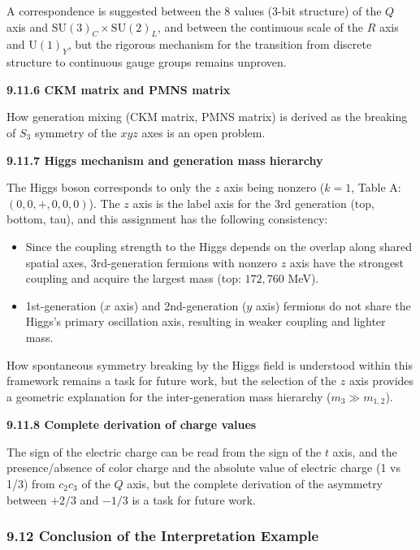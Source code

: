 \documentclass[
  a4paper,11pt]{article}
\providecommand{\tightlist}{%
  \setlength{\itemsep}{0pt}\setlength{\parskip}{0pt}}
\theoremstyle{definition}
\theoremstyle{remark}
\begin{document}
A correspondence is suggested between the 8 values (3-bit structure) of
the \(Q\) axis and \(\mathrm{SU}(3)_C \times \mathrm{SU}(2)_L\), and
between the continuous scale of the \(R\) axis and \(\mathrm{U}(1)_Y\),
but the rigorous mechanism for the transition from discrete structure to
continuous gauge groups remains unproven.

\textbf{9.11.6 CKM matrix and PMNS matrix}

How generation mixing (CKM matrix, PMNS matrix) is derived as the
breaking of \(S_3\) symmetry of the \(xyz\) axes is an open problem.

\textbf{9.11.7 Higgs mechanism and generation mass hierarchy}

The Higgs boson corresponds to only the \(z\) axis being nonzero
(\(k = 1\), Table A: \((0, 0, +, 0, 0, 0)\)). The \(z\) axis is the
label axis for the 3rd generation (top, bottom, tau), and this
assignment has the following consistency:

\begin{itemize}
\tightlist
\item
  Since the coupling strength to the Higgs depends on the overlap along
  shared spatial axes, 3rd-generation fermions with nonzero \(z\) axis
  have the strongest coupling and acquire the largest mass (top:
  \(172{,}760\) MeV).
\item
  1st-generation (\(x\) axis) and 2nd-generation (\(y\) axis) fermions
  do not share the Higgs's primary oscillation axis, resulting in weaker
  coupling and lighter mass.
\end{itemize}

How spontaneous symmetry breaking by the Higgs field is understood
within this framework remains a task for future work, but the selection
of the \(z\) axis provides a geometric explanation for the
inter-generation mass hierarchy (\(m_3 \gg m_{1,2}\)).

\textbf{9.11.8 Complete derivation of charge values}

The sign of the electric charge can be read from the sign of the \(t\)
axis, and the presence/absence of color charge and the absolute value of
electric charge (1 vs 1/3) from \(c_2 c_3\) of the \(Q\) axis, but the
complete derivation of the asymmetry between \(+2/3\) and \(-1/3\) is a
task for future work.

\subsubsection{9.12 Conclusion of the Interpretation
Example}\label{conclusion-of-the-interpretation-example}
\end{document}
